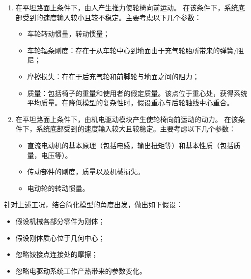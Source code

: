 \begin{enumerate}
	\item 在平坦路面上条件下，由人产生推力使轮椅向前运动。
	在该条件下，系统底部受到的速度输入较小且较不稳定。主要考虑以下几个参数：
	\begin{itemize}
		\item 车轮转动惯量，转动惯量；
		
		\item 车轮辐条刚度：存在于从车轮中心到地面由于充气轮胎所带来的弹簧/阻尼；
		
		\item 摩擦损失：存在于后充气轮和前脚轮与地面之间的阻力；
		
		\item 质量：包括椅子的重量和使用者的假定质量。该点位于重心处，获得系统平均质量。在降低模型的复杂性时，假设重心与后轮轴线中心重合。
	\end{itemize}
	
	\item 在平坦路面上条件下，由机电驱动模块产生使轮椅向前运动的动力。
	在该条件下，系统底部受到的速度输入较大且较稳定。主要考虑以下几个参数：
	\begin{itemize}
		\item 直流电动机的基本原理（包括电感，输出扭矩等）和基本性质（包括质量，电压等）。
		
		\item 传动部件的刚度，质量以及机械损失。
		
		\item 电动轮的转动惯量。
	\end{itemize}
	
\end{enumerate}



针对上述工况，结合简化模型的角度出发，做出如下假设：

\begin{itemize}
	
	\item 假设机械各部分零件为刚体；
	
	\item 假设刚体质心位于几何中心；
	
	\item 忽略铰接点连接处的摩擦；
	
	\item 忽略电驱动系统工作产热带来的参数变化。
	
\end{itemize}
